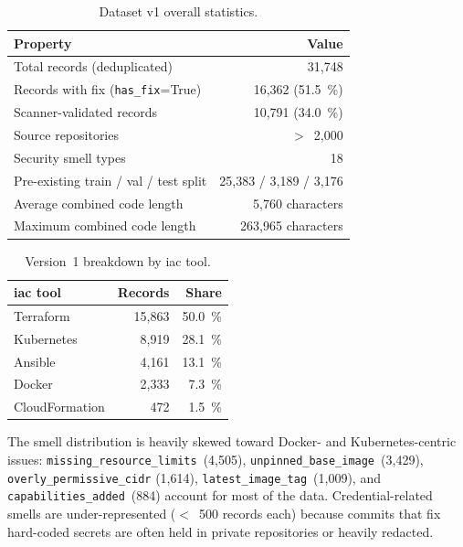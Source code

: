 \documentclass[12pt, a4paper]{report}
\begin{document}
\begin{table}[H]
  \centering
  \caption{Dataset v1 overall statistics.}
  \label{tab:v1-stats}
  \small
  \begin{tabular}{lr}
    \toprule
    \textbf{Property} & \textbf{Value} \\
    \midrule
    Total records (deduplicated) & 31{,}748 \\
    Records with fix (\texttt{has\_fix}=True) & 16{,}362 (51.5~\%) \\
    Scanner-validated records & 10{,}791 (34.0~\%) \\
    Source repositories & $>$~2{,}000 \\
    Security smell types & 18 \\
    Pre-existing train / val / test split & 25{,}383 / 3{,}189 / 3{,}176 \\
    Average combined code length & 5{,}760 characters \\
    Maximum combined code length & 263{,}965 characters \\
    \bottomrule
  \end{tabular}
\end{table}

\begin{table}[H]
  \centering
  \caption{Version~1 breakdown by \gls{iac} tool.}
  \label{tab:v1-by-tool}
  \small
  \begin{tabular}{lrr}
    \toprule
    \textbf{\gls{iac} tool} & \textbf{Records} & \textbf{Share} \\
    \midrule
    Terraform       & 15{,}863 & 50.0~\% \\
    Kubernetes      &  8{,}919 & 28.1~\% \\
    Ansible         &  4{,}161 & 13.1~\% \\
    Docker          &  2{,}333 &  7.3~\% \\
    CloudFormation  &    472   &  1.5~\% \\
    \bottomrule
  \end{tabular}
\end{table}

The smell distribution is heavily skewed toward Docker- and
Kubernetes-centric issues: \texttt{missing\_resource\_limits}~(4{,}505),
\texttt{unpinned\_base\_image}~(3{,}429), \texttt{overly\_permissive\_cidr}
(1{,}614), \texttt{latest\_image\_tag}~(1{,}009), and
\texttt{capabilities\_added}~(884) account for most of the data.
Credential-related smells are under-represented ($<$~500 records each)
because commits that fix hard-coded secrets are often held in private
repositories or heavily redacted.
\end{document}
